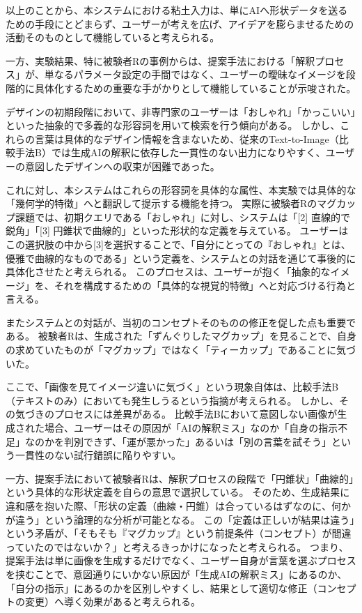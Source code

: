 \documentclass{kuisthesis}
\begin{document}
以上のことから、本システムにおける粘土入力は、単にAIへ形状データを送るための手段にとどまらず、ユーザーが考えを広げ、アイデアを膨らませるための活動そのものとして機能していると考えられる。


一方、実験結果、特に被験者Rの事例からは、提案手法における「解釈プロセス」が、単なるパラメータ設定の手間ではなく、ユーザーの曖昧なイメージを段階的に具体化するための重要な手がかりとして機能していることが示唆された。

デザインの初期段階において、非専門家のユーザーは「おしゃれ」「かっこいい」といった抽象的で多義的な形容詞を用いて検索を行う傾向がある。
しかし、これらの言葉は具体的なデザイン情報を含まないため、従来のText-to-Image（比較手法B）では生成AIの解釈に依存した一貫性のない出力になりやすく、ユーザーの意図したデザインへの収束が困難であった。

これに対し、本システムはこれらの形容詞を具体的な属性、本実験では具体的な「幾何学的特徴」へと翻訳して提示する機能を持つ。
実際に被験者Rのマグカップ課題では、初期クエリである「おしゃれ」に対し、システムは「[2] 直線的で鋭角」「[3] 円錐状で曲線的」といった形状的な定義を与えている。
ユーザーはこの選択肢の中から[3]を選択することで、「自分にとっての『おしゃれ』とは、優雅で曲線的なものである」という定義を、システムとの対話を通じて事後的に具体化させたと考えられる。
このプロセスは、ユーザーが抱く「抽象的なイメージ」を、それを構成するための「具体的な視覚的特徴」へと対応づける行為と言える。

またシステムとの対話が、当初のコンセプトそのものの修正を促した点も重要である。
被験者Rは、生成された「ずんぐりしたマグカップ」を見ることで、自身の求めていたものが「マグカップ」ではなく「ティーカップ」であることに気づいた。

ここで、「画像を見てイメージ違いに気づく」という現象自体は、比較手法B（テキストのみ）においても発生しうるという指摘が考えられる。
しかし、その気づきのプロセスには差異がある。
比較手法Bにおいて意図しない画像が生成された場合、ユーザーはその原因が「AIの解釈ミス」なのか「自身の指示不足」なのかを判別できず、「運が悪かった」あるいは「別の言葉を試そう」という一貫性のない試行錯誤に陥りやすい。

一方、提案手法において被験者Rは、解釈プロセスの段階で「円錐状」「曲線的」という具体的な形状定義を自らの意思で選択している。
そのため、生成結果に違和感を抱いた際、「形状の定義（曲線・円錐）は合っているはずなのに、何かが違う」という論理的な分析が可能となる。
この「定義は正しいが結果は違う」という矛盾が、「そもそも『マグカップ』という前提条件（コンセプト）が間違っていたのではないか？」と考えるきっかけになったと考えられる。
つまり、提案手法は単に画像を生成するだけでなく、ユーザー自身が言葉を選ぶプロセスを挟むことで、意図通りにいかない原因が「生成AIの解釈ミス」にあるのか、「自分の指示」にあるのかを区別しやすくし、結果として適切な修正（コンセプトの変更）へ導く効果があると考えられる。
\end{document}
